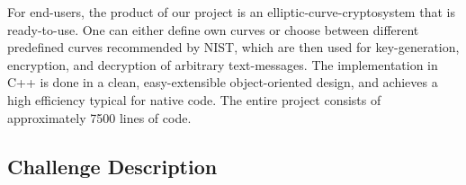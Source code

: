 \documentclass[11pt,english]{article}
\begin{document}
For end-users, the product of our project is an elliptic-curve-cryptosystem that is ready-to-use. One can either define own curves or choose between different predefined curves recommended by NIST, which are then used for key-generation, encryption, and decryption of arbitrary text-messages. The implementation in C++ is done in a clean, easy-extensible object-oriented design, and achieves a high efficiency typical for native code. The entire project consists of approximately 7500 lines of code.

\begin{appendix}
\section{Challenge Description}
\label{appendixa}

\end{appendix}

\newpage


\end{document}
